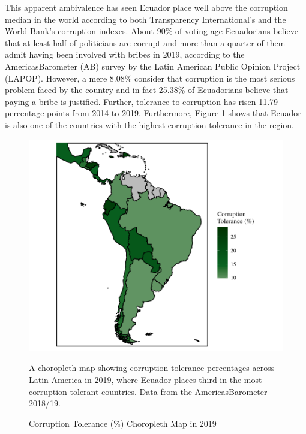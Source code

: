 \documentclass[12pt,a4]{article}\usepackage[]{graphicx}\usepackage[]{xcolor}
\begin{document}
This apparent ambivalence has seen Ecuador place well above the corruption median in the world according to both Transparency International's and the World Bank's corruption indexes. About 90\% of voting-age Ecuadorians believe that at least half of politicians are corrupt and more than a quarter of them admit having been involved with bribes in 2019, according to the AmericasBarometer (AB) survey by the Latin American Public Opinion Project (LAPOP). However, a mere 8.08\% consider that corruption is the most serious problem faced by the country and in fact 25.38\% of Ecuadorians believe that paying a bribe is justified. Further, tolerance to corruption has risen 11.79 percentage points from 2014 to 2019. Furthermore, Figure \ref{fig:ctolmap} shows that Ecuador is also one of the countries with the highest corruption tolerance in the region.



\begin{figure}[htbp!]
    \begin{center}
    \includegraphics{images/ctol_map.pdf}
    \end{center}
      \label{fig:ctolmap}
      \caption{Corruption Tolerance (\%) Choropleth Map in 2019}
A choropleth map showing corruption tolerance percentages across Latin America in 2019, where Ecuador places third in the most corruption tolerant countries. Data from the \textregistered AmericasBarometer 2018/19. 
\end{figure}
\end{document}
